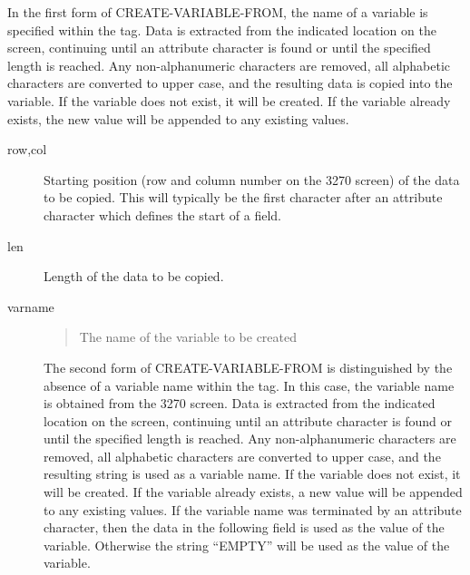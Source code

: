 \documentclass[letterpaper,10pt,english]{sphinxmanual}
\begin{document}
In the first form of CREATE-VARIABLE-FROM, the name of a variable is specified within the tag. Data is extracted from the indicated location on the screen, continuing until an attribute character is found or until the specified length is reached. Any non-alphanumeric characters are removed, all alphabetic characters are converted to upper case, and the resulting data is copied into the variable. If the variable does not exist, it will be created. If the variable already exists, the new value will be appended to any existing values.

\begin{sphinxVerbatim}[commandchars=\\\{\}]
      
\end{sphinxVerbatim}
\begin{description}
\item[{row,col}] \leavevmode
Starting position (row and column number on the 3270 screen) of the
data to be copied. This will typically be the first character after
an attribute character which defines the start of a field.

\item[{len}] \leavevmode
Length of the data to be copied.

\item[{varname}] \leavevmode\begin{quote}

The name of the variable to be created
\end{quote}

The second form of CREATE-VARIABLE-FROM is distinguished by the absence of a variable name within the tag. In this case, the variable name is obtained from the 3270 screen. Data is extracted from the indicated location on the screen, continuing until an attribute character is found or until the specified length is reached. Any non-alphanumeric characters are removed, all alphabetic characters are converted to upper case, and the resulting string is used as a variable name. If the variable does not exist, it will be created. If the variable already exists, a new value will be appended to any existing values. If the variable name was terminated by an attribute character, then the data in the following field is used as the value of the variable. Otherwise the string “EMPTY” will
be used as the value of the variable.

\end{description}
\end{document}
